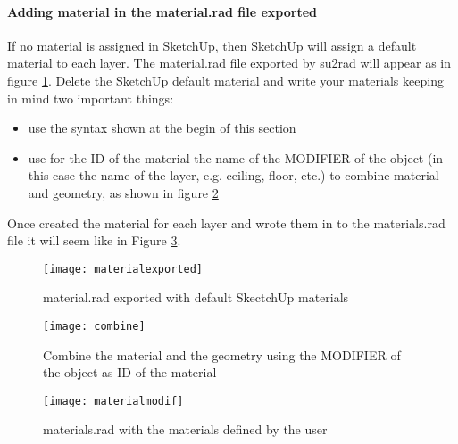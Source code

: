 \paragraph{Adding material in the material.rad file exported}
If no material is assigned in SketchUp, then SketchUp will assign a default material to each layer. The material.rad file exported by su2rad will appear as in figure \ref{img1:materialexported}. Delete the SketchUp default material and write your materials keeping in mind two important things:
\begin{itemize}
\renewcommand{\labelitemi}{\tiny$\blacksquare$}
\item use the syntax shown at the begin of this section
\item use for the ID of the material the name of the MODIFIER of the object (in this case the name of the layer, e.g. ceiling, floor, etc.) to combine material and geometry, as shown in figure \ref{img1:combine}
\end{itemize} 
Once created the material for each layer and wrote them in to the materials.rad file it will seem like in Figure \ref{img1:materialmodif}.
\begin{figure}[h]
\centering
\texttt{[image: materialexported]}
\caption{\label{img1:materialexported} material.rad exported with default SkectchUp materials}
\end{figure}


\begin{figure}[h]
\centering
\texttt{[image: combine]}
\caption{\label{img1:combine} Combine the material and the geometry using the MODIFIER of the object as ID of the material}
\end{figure}

\begin{figure}[h]
\centering
\texttt{[image: materialmodif]}
\caption{\label{img1:materialmodif} materials.rad with the materials defined by the user}
\end{figure}



